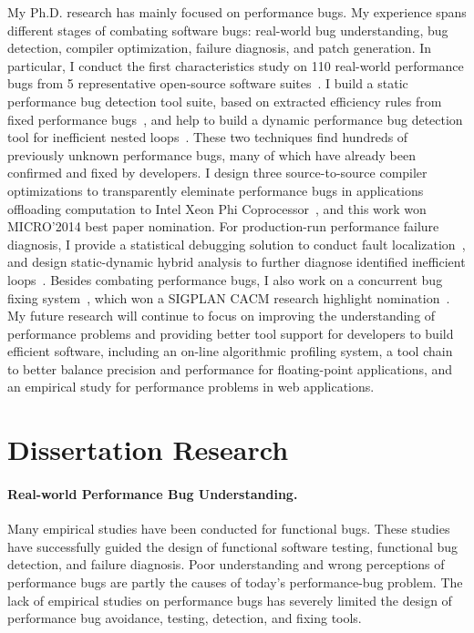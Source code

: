 \documentclass[10pt]{article}
\begin{document}
My Ph.D. research has mainly focused on performance bugs. My experience spans different
stages of combating software bugs: real-world bug understanding, bug detection,
compiler optimization, failure diagnosis, and patch generation.
In particular, I conduct the first characteristics study on 110 real-world performance bugs 
from 5 representative open-source software suites~\cite{jin12perfbug}.
I build a static performance bug detection tool suite, based on extracted efficiency rules from fixed performance bugs~\cite{jin12perfbug}, 
and help to build a dynamic performance bug detection tool for inefficient nested loops~\cite{Nistor13ICSE}. 
These two techniques find hundreds of previously unknown performance bugs, many of which have already been confirmed and fixed by developers. 
I design three source-to-source compiler optimizations to transparently eleminate performance bugs in 
applications offloading computation to Intel Xeon Phi Coprocessor~\cite{Song14MICRO}, 
and this work won MICRO'2014 best paper nomination. 
For production-run performance failure diagnosis, I provide a statistical debugging solution to conduct fault localization~\cite{Song14OOPSLA}, 
and design static-dynamic hybrid analysis to further diagnose identified inefficient loops~\cite{Song15OOPSLA}. 
Besides combating performance bugs, 
I also work on a concurrent bug fixing system~\cite{jin11afix}, 
which won a SIGPLAN CACM research highlight nomination~\cite{afixnom}. 
My future research will continue to focus on improving the understanding of performance problems and
providing better tool support for developers to build efficient software, 
including an on-line algorithmic profiling system, 
a tool chain to better balance precision and performance for floating-point applications, 
and an empirical study for performance problems in web applications.


\section{Dissertation Research}

\paragraph{Real-world Performance Bug Understanding.}
Many empirical studies have been conducted for functional bugs. 
These studies have successfully guided the design of functional software testing, functional bug detection, and failure diagnosis. 
Poor understanding and wrong perceptions of performance bugs are partly the causes of today's performance-bug problem. 
The lack of empirical studies on performance bugs has severely limited the design of performance bug avoidance, testing, detection, and fixing tools. 
\end{document}
